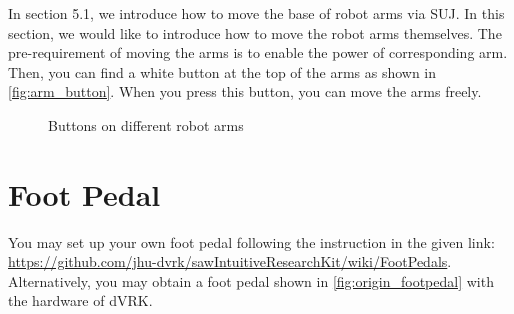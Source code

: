 In section 5.1, we introduce how to move the base of robot arms via SUJ. In this section, we would like to introduce how to move the robot arms themselves. The pre-requirement of moving the arms is to enable the power of corresponding arm. Then, you can find a white button at the top of the arms as shown in \autoref{fig:arm_button}. When you press this button, you can move the arms freely.

\begin{figure}[H]
\centering
{}
\hfil
{}
\caption{Buttons on different robot arms}
\label{fig:arm_button}
\end{figure}

\section{Foot Pedal}

You may set up your own foot pedal following the instruction in the given link: \url{https://github.com/jhu-dvrk/sawIntuitiveResearchKit/wiki/FootPedals}. Alternatively, you may obtain a foot pedal shown in \autoref{fig:origin_footpedal} with the hardware of dVRK.

